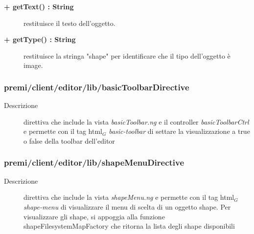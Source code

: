 \begin{description}
\begin{description}
\end{description}

\begin{description}
		\item[\textbf{\color{blue}+ getText() : String			}] \hfill
			restituisce il testo dell'oggetto. 

\end{description}

\begin{description}
		\item[\textbf{\color{blue}+ getType() : String			}] \hfill
			restituisce la stringa "shape" per identificare che il tipo dell'oggetto è image. 

\end{description}



\end{description}

\subsubsection{premi/client/editor/lib/basicToolbarDirective}

\begin{description}
\item[Descrizione] \hfill
	direttiva che include la vista \textit{basicToolbar.ng} e il controller \textit{basicToolbarCtrl} e permette con il tag html$_G$ \textit{basic-toolbar} di settare la visualizzazione a true o false della toolbar dell'editor
\end{description}

\subsubsection{premi/client/editor/lib/shapeMenuDirective}

\begin{description}
\item[Descrizione] \hfill
	direttiva che include la vista \textit{shapeMenu.ng} e permette con il tag html$_G$ \textit{shape-menu} di visualizzare il menu di scelta di un oggetto shape. Per visualizzare gli shape, si appoggia alla funzione shapeFilesystemMapFactory che ritorna la lista degli shape disponibili
\end{description}










